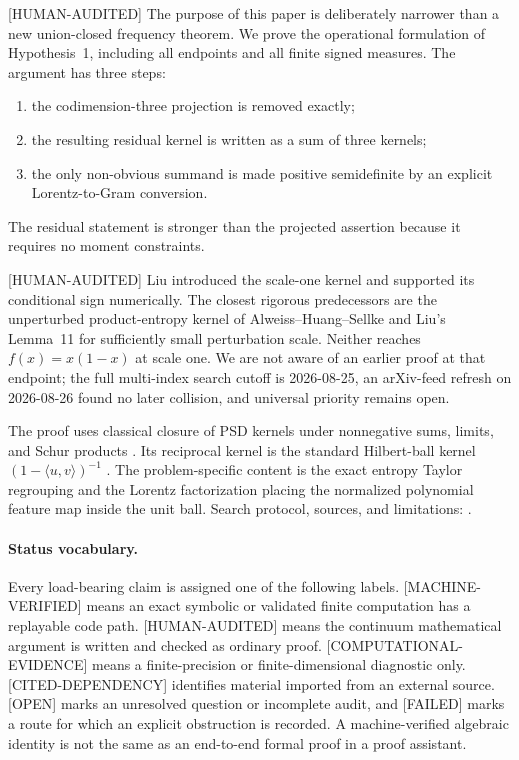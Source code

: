 \documentclass[11pt]{article}
\theoremstyle{plain}
\theoremstyle{definition}
\theoremstyle{remark}
\newcommand{\status}[1]{\textnormal{\textsf{\footnotesize[#1]}}}
\newcommand{\MachineVerified}{\status{MACHINE-VERIFIED}}
\newcommand{\HumanAudited}{\status{HUMAN-AUDITED}}
\newcommand{\ComputationalEvidence}{\status{COMPUTATIONAL-EVIDENCE}}
\newcommand{\CitedDependency}{\status{CITED-DEPENDENCY}}
\newcommand{\OpenStatus}{\status{OPEN}}
\newcommand{\FailedStatus}{\status{FAILED}}
\begin{document}
\HumanAudited{} The purpose of this paper is deliberately narrower than a
new union-closed frequency theorem.  We prove the operational formulation of
Hypothesis~1, including all endpoints and all finite signed measures.  The
argument has three steps:
\begin{enumerate}[label=(\roman*)]
  \item the codimension-three projection is removed exactly;
  \item the resulting residual kernel is written as a sum of three kernels;
  \item the only non-obvious summand is made positive semidefinite by an
        explicit Lorentz-to-Gram conversion.
\end{enumerate}
The residual statement is stronger than the projected assertion because it
requires no moment constraints.

\HumanAudited{} Liu introduced the scale-one kernel and supported its
conditional sign numerically.  The closest rigorous predecessors are the
unperturbed product-entropy kernel of Alweiss--Huang--Sellke
\cite[Lemma~5]{ahs} and Liu's Lemma~11 for sufficiently small perturbation
scale.  Neither reaches \(f(x)=x(1-x)\) at scale one.  We are not aware of an
earlier proof at that endpoint; the full multi-index search cutoff is
2026-08-25, an arXiv-feed refresh on 2026-08-26 found no later collision, and
universal priority remains open.

The proof uses classical closure of PSD kernels under nonnegative sums,
limits, and Schur products \cite[Theorem~7.5.3]{horn-johnson}.  Its reciprocal
kernel is the standard Hilbert-ball kernel
\((1-\langle u,v\rangle)^{-1}\) \cite{agler-mccarthy}.  The
problem-specific content is the exact entropy Taylor regrouping and the
Lorentz factorization placing the normalized polynomial feature map inside
the unit ball.  Search protocol, sources, and limitations:
.

\paragraph{Status vocabulary.}
Every load-bearing claim is assigned one of the following labels.
\MachineVerified{} means an exact symbolic or validated finite computation
has a replayable code path.  \HumanAudited{} means the continuum mathematical
argument is written and checked as ordinary proof.  \ComputationalEvidence{}
means a finite-precision or finite-dimensional diagnostic only.
\CitedDependency{} identifies material imported from an external source.
\OpenStatus{} marks an unresolved question or incomplete audit, and
\FailedStatus{} marks a route for which an explicit obstruction is recorded.
A machine-verified algebraic identity is not the same as an end-to-end formal
proof in a proof assistant.
\end{document}
